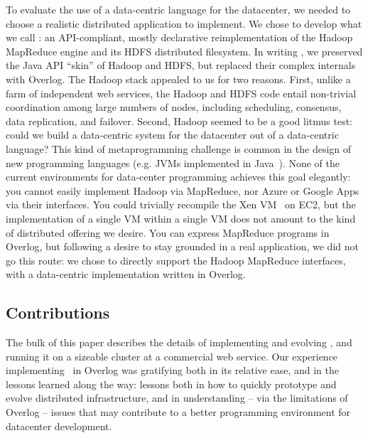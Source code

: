 \documentclass{sig-alternate}
\begin{document}
To evaluate the use of a data-centric language for the datacenter, we needed to choose a realistic distributed application to implement.  We chose to develop what we call {\em \BOOM}: an API-compliant, mostly declarative reimplementation of the Hadoop MapReduce engine and its HDFS distributed filesystem.  In writing \BOOM, we preserved the Java API ``skin'' of Hadoop and HDFS, but replaced their complex internals with Overlog.  The Hadoop stack appealed to us for two reasons.   First, unlike a farm of independent web services, the Hadoop and HDFS code entail non-trivial coordination among large numbers of nodes, including scheduling, consensus, data replication, and failover.  Second, Hadoop seemed to be a good litmus test: could we build a data-centric system for the datacenter out of a data-centric language?   This kind of metaprogramming challenge is common in the design of new programming languages (e.g. JVMs implemented in Java~\cite{JikesRVMJalapeno,joeq}). None of the current environments for data-center programming achieves this goal elegantly: you cannot easily implement Hadoop via MapReduce, nor Azure or Google Apps via their interfaces.  You could trivially recompile the Xen VM~\cite{xen} on EC2, but the implementation of a single VM within a single VM does not amount to the kind of distributed offering we desire.  You can  express MapReduce programs in Overlog, but following a desire to stay grounded in a real application, we did not go this route: we chose to directly support the Hadoop MapReduce interfaces, with a data-centric implementation written in Overlog.

\subsection{Contributions}
The bulk of this paper describes the details of implementing and evolving \BOOM, and running it on a sizeable cluster at a commercial web service.  Our experience implementing \BOOM\ in Overlog was gratifying both in its relative ease, and in the lessons learned along the way: lessons both in how to quickly prototype and evolve distributed infrastructure, and in understanding -- via the limitations of Overlog -- issues that may contribute to a better programming environment for datacenter development.
\end{document}
